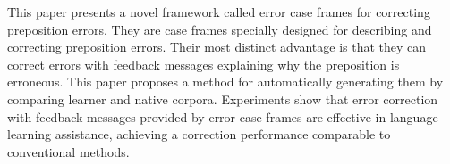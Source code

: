 This paper presents a novel framework called error case frames for correcting preposition errors. They are case frames specially designed for describing and correcting preposition errors. Their most distinct advantage is that they can correct errors with feedback messages explaining why the preposition is erroneous. This paper proposes a method for automatically generating them by comparing learner and native corpora. Experiments show that error correction with feedback messages provided by error case frames are effective in language learning assistance, achieving a correction performance comparable to conventional methods.
